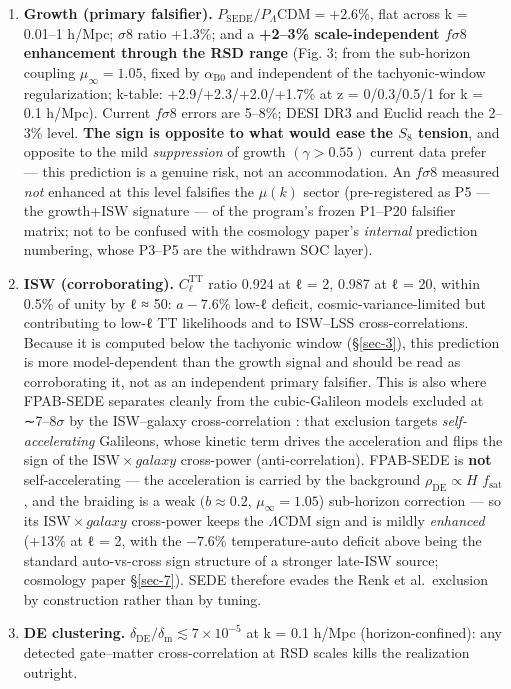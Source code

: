 \documentclass[preprint,12pt]{elsarticle}
\providecommand{\tightlist}{\setlength{\itemsep}{0pt}\setlength{\parskip}{0pt}}
\begin{document}
\begin{enumerate}
\def\labelenumi{\arabic{enumi}.}
\tightlist
\item
  \textbf{Growth (primary falsifier).}
  \(P_\mathrm{SEDE}/P_\Lambda \mathrm{CDM} = +2.6\)\%, flat across k =
  0.01--1 h/Mpc; \(\sigma 8\) ratio +1.3\%; and a \textbf{+2--3\%
  scale-independent \(f\sigma 8\) enhancement through the RSD range}
  (Fig. 3; from the sub-horizon coupling \(\mu _\infty  = 1.05\), fixed
  by \(\alpha _{\mathrm{B0}}\) and independent of the tachyonic-window
  regularization; k-table: +2.9/+2.3/+2.0/+1.7\% at z = 0/0.3/0.5/1 for
  k = 0.1 h/Mpc). Current \(f\sigma 8\) errors are 5--8\%; DESI DR3 and
  Euclid reach the 2--3\% level. \textbf{The sign is opposite to what
  would ease the \(S_{8}\) tension}, and opposite to the mild
  \emph{suppression} of growth \((\gamma  > 0.55)\) current data prefer
  \citep{Nguyen:2023fip} --- this prediction is a genuine risk, not an
  accommodation. An \(f\sigma 8\) measured \emph{not} enhanced at this
  level falsifies the \(\mu (k)\) sector (pre-registered as P5 --- the
  growth+ISW signature --- of the program's frozen P1--P20 falsifier
  matrix; not to be confused with the cosmology paper's \emph{internal}
  prediction numbering, whose P3--P5 are the withdrawn SOC layer).
\item
  \textbf{ISW (corroborating).} \(C_\ell ^\mathrm{TT}\) ratio 0.924 at ℓ
  = 2, 0.987 at ℓ = 20, within 0.5\% of unity by ℓ ≈ 50: \(a -7.6\)\%
  low-ℓ deficit, cosmic-variance-limited but contributing to low-ℓ TT
  likelihoods and to ISW--LSS cross-correlations. Because it is computed
  below the tachyonic window (§\ref{sec-3}), this prediction is more
  model-dependent than the growth signal and should be read as
  corroborating it, not as an independent primary falsifier. This is
  also where FPAB-SEDE separates cleanly from the cubic-Galileon models
  excluded at ∼7--\(8\sigma\) by the ISW--galaxy cross-correlation
  \citep{Renk:2017rzu}: that exclusion targets \emph{self-accelerating}
  Galileons, whose kinetic term drives the acceleration and flips the
  sign of the \(\mathrm{ISW}\times galaxy\) cross-power
  (anti-correlation). FPAB-SEDE is \textbf{not} self-accelerating ---
  the acceleration is carried by the background
  \(\rho _\mathrm{DE} \propto  H\) \(f_{\mathrm{sat}}\), and the
  braiding is a weak \((b \approx  0.2\), \(\mu _\infty  = 1.05\))
  sub-horizon correction --- so its \(\mathrm{ISW}\times galaxy\)
  cross-power keeps the \(\Lambda \mathrm{CDM}\) sign and is mildly
  \emph{enhanced} (+13\% at ℓ = 2, with the \(-7.6\)\% temperature-auto
  deficit above being the standard auto-vs-cross sign structure of a
  stronger late-ISW source; cosmology paper §\ref{sec-7}). SEDE
  therefore evades the Renk et al.~exclusion by construction rather than
  by tuning.
\item
  \textbf{DE clustering.}
  \(\delta _\mathrm{DE}/\delta _{\mathrm{m}} \lesssim  7\times 10^{-5}\)
  at k = 0.1 h/Mpc (horizon-confined): any detected gate--matter
  cross-correlation at RSD scales kills the realization outright.
\end{enumerate}
\end{document}
